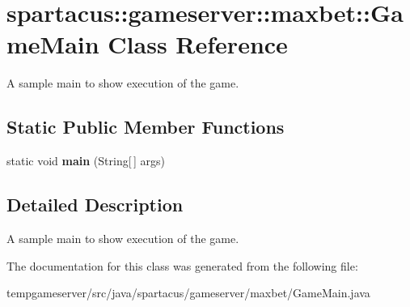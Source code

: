 \hypertarget{classspartacus_1_1gameserver_1_1maxbet_1_1GameMain}{
\section{\-s\-p\-a\-r\-t\-a\-c\-u\-s\-:\-:\-g\-a\-m\-e\-s\-e\-r\-v\-e\-r\-:\-:\-m\-a\-x\-b\-e\-t\-:\-:\-G\-a\-m\-e\-M\-a\-i\-n \-C\-l\-a\-s\-s \-R\-e\-f\-e\-r\-e\-n\-c\-e}
\label{classspartacus_1_1gameserver_1_1maxbet_1_1GameMain}
}


A sample main to show execution of the game.  


\subsection*{Static Public Member Functions}
\begin{DoxyCompactItemize}
\item 
\hypertarget{classspartacus_1_1gameserver_1_1maxbet_1_1GameMain_ab3ea1a32de8a0eb7c81fe60a06878492}{
\-s\-t\-a\-t\-i\-c \-v\-o\-i\-d {\bfseries \-m\-a\-i\-n} \-(\-S\-t\-r\-i\-n\-g\mbox{[}$\,$\mbox{]} \-a\-r\-g\-s\-)}
\label{classspartacus_1_1gameserver_1_1maxbet_1_1GameMain_ab3ea1a32de8a0eb7c81fe60a06878492}

\end{DoxyCompactItemize}


\subsection{Detailed Description}
A sample main to show execution of the game. 

The documentation for this class was generated from the following file:\begin{DoxyCompactItemize}
\item 
\-t\-e\-m\-p\-g\-a\-m\-e\-s\-e\-r\-v\-e\-r\-/\-s\-r\-c\-/\-j\-a\-v\-a\-/\-s\-p\-a\-r\-t\-a\-c\-u\-s\-/\-g\-a\-m\-e\-s\-e\-r\-v\-e\-r\-/\-m\-a\-x\-b\-e\-t\-/\-G\-a\-m\-e\-M\-a\-i\-n\-.\-j\-a\-v\-a\end{DoxyCompactItemize}
